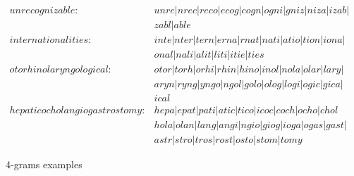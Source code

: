         \begin{figure}
            \begin{align*}
                unrecognizable : &unre \vert nrec \vert reco \vert ecog \vert cogn \vert ogni \vert gniz \vert niza \vert izab \vert\\ 
                &zabl \vert able\\
                internationalities : &inte \vert nter \vert tern \vert erna \vert rnat \vert nati \vert atio \vert tion \vert iona \vert\\
                &onal \vert nali \vert alit \vert liti \vert itie \vert ties\\
                otorhinolaryngological : &otor \vert torh \vert orhi \vert rhin \vert hino \vert inol \vert nola \vert olar \vert lary \vert \\
                &aryn \vert ryng \vert yngo \vert ngol \vert golo \vert olog \vert logi \vert ogic \vert gica \vert\\
                &ical\\
                hepaticocholangiogastrostomy : &hepa \vert epat \vert pati \vert atic \vert tico \vert icoc \vert coch \vert ocho \vert chol\\
                &hola \vert olan \vert lang \vert angi \vert ngio \vert giog \vert ioga \vert ogas \vert gast \vert\\
                &astr \vert stro \vert tros \vert rost \vert osto \vert stom \vert tomy
            \end{align*}
            \caption{4-grams examples}
            \label{fig:4grams}
        \end{figure}


